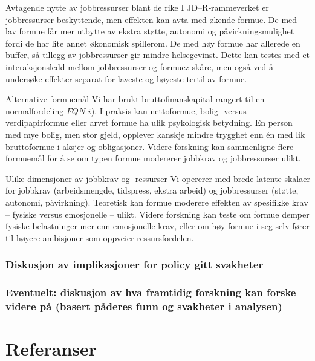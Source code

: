 \documentclass[
  12pt,
  a4paper,
  DIV=11,
  numbers=noendperiod]{scrartcl}
\begin{document}
Avtagende nytte av jobbressurser blant de rike I JD--R‐rammeverket er
jobbressurser beskyttende, men effekten kan avta med økende formue. De
med lav formue får mer utbytte av ekstra støtte, autonomi og
påvirkningsmulighet fordi de har lite annet økonomisk spillerom. De med
høy formue har allerede en buffer, så tillegg av jobbressurser gir
mindre helsegevinst. Dette kan testes med et interaksjonsledd mellom
jobbressurser og formuez‐skåre, men også ved å undersøke effekter
separat for laveste og høyeste tertil av formue.

Alternative formuemål Vi har brukt bruttofinanskapital rangert til en
normalfordeling \(FQN\_i\)). I praksis kan nettoformue, bolig‐ versus
verdipapirformue eller arvet formue ha ulik psykologisk betydning. En
person med mye bolig, men stor gjeld, opplever kanskje mindre trygghet
enn én med lik bruttoformue i aksjer og obligasjoner. Videre forskning
kan sammenligne flere formuemål for å se om typen formue modererer
jobbkrav og jobbressurser ulikt.

Ulike dimensjoner av jobbkrav og -ressurser Vi opererer med brede
latente skalaer for jobbkrav (arbeidsmengde, tidspress, ekstra arbeid)
og jobbressurser (støtte, autonomi, påvirkning). Teoretisk kan formue
moderere effekten av spesifikke krav -- fysiske versus emosjonelle --
ulikt. Videre forskning kan teste om formue demper fysiske belastninger
mer enn emosjonelle krav, eller om høy formue i seg selv fører til
høyere ambisjoner som oppveier ressursfordelen.

\subsubsection{Diskusjon av implikasjoner for policy gitt
svakheter}\label{diskusjon-av-implikasjoner-for-policy-gitt-svakheter}

\subsubsection{Eventuelt: diskusjon av hva framtidig forskning kan
forske videre på (basert påderes funn og svakheter i
analysen)}\label{eventuelt-diskusjon-av-hva-framtidig-forskning-kan-forske-videre-puxe5-basert-puxe5deres-funn-og-svakheter-i-analysen}

\newpage

\section*{Referanser}\label{referanser}
\end{document}
